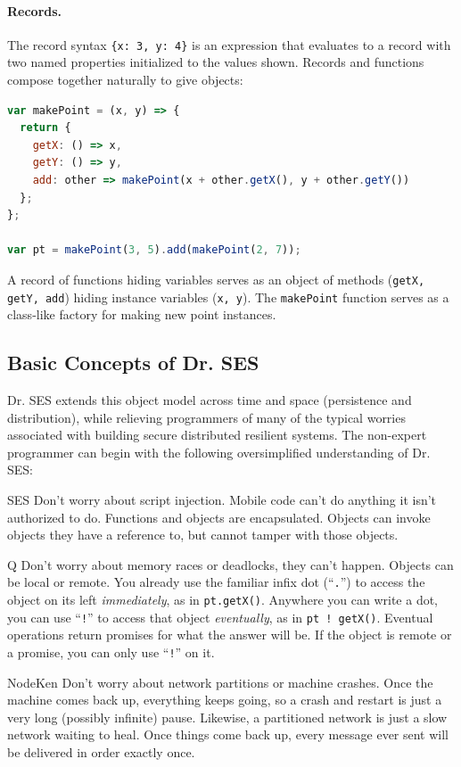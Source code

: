 \documentclass{llncs}
\begin{document}
\paragraph{Records.} 

The record syntax {\tt \{x: 3, y: 4\}} is an expression that evaluates to a record with two named properties initialized to the values shown. Records and functions compose together naturally to give objects:

\begin{lstlisting}[language=JavaScript,numbers=none]
var makePoint = (x, y) => {
  return {
    getX: () => x,
    getY: () => y,
    add: other => makePoint(x + other.getX(), y + other.getY())
  };
};

var pt = makePoint(3, 5).add(makePoint(2, 7));
\end{lstlisting}

A record of functions hiding variables serves as an object of methods ({\tt getX, getY, add}) hiding instance variables ({\tt x, y}). The {\tt makePoint} function serves as a class-like factory for making new point instances.

\subsection{Basic Concepts of Dr. SES}
\label{enoughdrses}

Dr. SES extends this object model across time and space (persistence and distribution), while relieving programmers of many of the typical worries associated with building secure distributed resilient systems. The non-expert programmer can begin with the following oversimplified understanding of Dr. SES:

\begin{description*}
\item[SES] Don't worry about script injection. Mobile code can't do anything it isn't authorized to do. Functions and objects are encapsulated. Objects can invoke objects they have a reference to, but cannot tamper with those objects.

\item[Q] Don't worry about memory races or deadlocks, they can't happen. Objects can be local or remote. You already use the familiar infix dot (``{\tt .}'') to access the object on its left \emph{immediately}, as in {\tt pt.getX()}. Anywhere you can write a dot, you can use ``{\tt !}'' to access that object \emph{eventually}, as in {\tt pt~!~getX()}. Eventual operations return promises for what the answer will be. If the object is remote or a promise, you can only use ``{\tt !}'' on it.

\item[NodeKen] Don't worry about network partitions or machine crashes. Once the machine comes back up, everything keeps going, so a crash and restart is just a very long (possibly infinite) pause. Likewise, a partitioned network is just a slow network waiting to heal. Once things come back up, every message ever sent will be delivered in order exactly once.
\end{description*}
\end{document}
